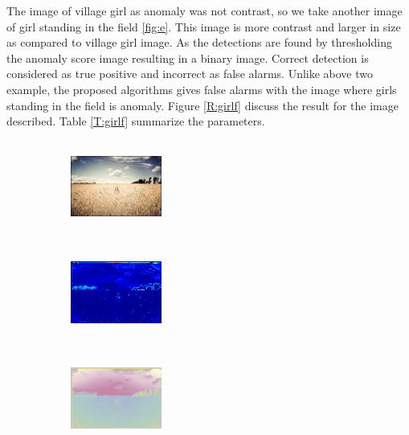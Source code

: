 The image of village girl as anomaly was not contrast, so we take another image of girl standing in the field \ref{fig:e}. This image is more contrast  and larger in size as compared to village girl image. As the detections are found by thresholding the anomaly score image resulting in a binary image. Correct detection is considered as true positive and incorrect as false alarms. Unlike above two example, the proposed algorithms gives false alarms with the image where girls standing in the field is anomaly. Figure \ref{R:girlf} discuss the result for the image described. Table \ref{T:girlf} summarize the parameters.

\begin{figure}[t!] %
\begin{subfigure}{0.32\textwidth}
\includegraphics[height=3cm,width=3cm]{./Figures/girlf/girlf.jpg}
\caption{} 
\end{subfigure}\hspace*{\fill}
\begin{subfigure}{0.32\textwidth}
\includegraphics[height=3cm,width=3cm]{./Figures/girlf/1.png}
\caption{} 
\end{subfigure}
\begin{subfigure}{0.32\textwidth}
\includegraphics[height=3cm,width=3cm]{./Figures/girlf/2.png}
\caption{} 
\end{subfigure}


\end{figure}
